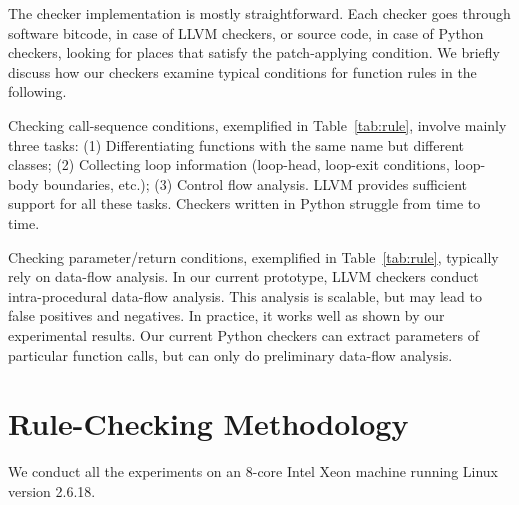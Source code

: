 
The checker implementation is mostly straightforward. Each checker goes through 
software bitcode, in case of LLVM checkers, or source code, in case of Python 
checkers, looking for places that satisfy the patch-applying condition. We
briefly discuss how our checkers examine typical conditions for function rules in the following.

Checking call-sequence conditions, exemplified in Table~\ref{tab:rule}, involve mainly three tasks: 
(1) Differentiating functions with the same name but different classes; 
(2) Collecting loop information (loop-head, loop-exit conditions, 
loop-body boundaries, etc.); (3) Control flow analysis. 
LLVM provides sufficient support for all these tasks. Checkers written in Python struggle from time to time.

Checking parameter/return conditions, exemplified in Table~\ref{tab:rule}, 
typically rely on data-flow analysis. In our current prototype, LLVM checkers 
conduct intra-procedural data-flow analysis. This analysis is scalable, 
but may lead to false positives and negatives. In practice, it works
well as shown by our experimental results. Our current Python checkers can 
extract parameters of particular function calls, but can only do preliminary data-flow analysis.




\section{Rule-Checking Methodology}
\label{sec:detection_meth}

We conduct all the experiments on an 8-core Intel Xeon
machine running Linux version 2.6.18. 

